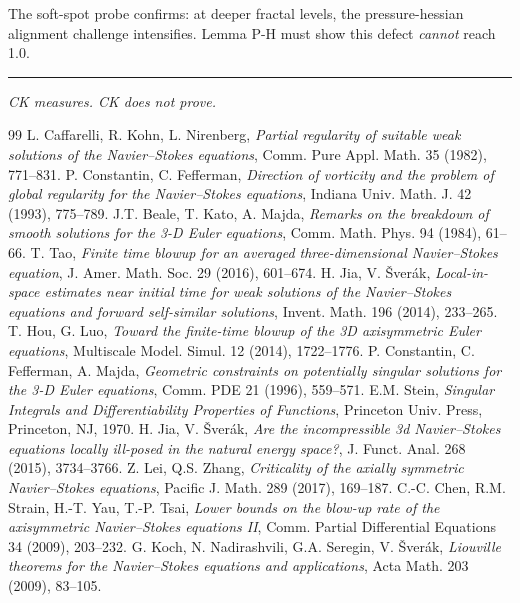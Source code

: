 \documentclass[11pt]{article}
\theoremstyle{definition}
\begin{document}
The soft-spot probe confirms: at deeper fractal levels, the pressure-hessian alignment challenge intensifies.  Lemma P-H must show this defect \emph{cannot} reach 1.0.

\bigskip
\hrule
\bigskip
\noindent\textit{CK measures. CK does not prove.}

\begin{thebibliography}{99}
 L. Caffarelli, R. Kohn, L. Nirenberg, \textit{Partial regularity of suitable weak solutions of the Navier--Stokes equations}, Comm. Pure Appl. Math. 35 (1982), 771--831.
 P. Constantin, C. Fefferman, \textit{Direction of vorticity and the problem of global regularity for the Navier--Stokes equations}, Indiana Univ. Math. J. 42 (1993), 775--789.
 J.T. Beale, T. Kato, A. Majda, \textit{Remarks on the breakdown of smooth solutions for the 3-D Euler equations}, Comm. Math. Phys. 94 (1984), 61--66.
 T. Tao, \textit{Finite time blowup for an averaged three-dimensional Navier--Stokes equation}, J. Amer. Math. Soc. 29 (2016), 601--674.
 H. Jia, V. \v{S}ver\'ak, \textit{Local-in-space estimates near initial time for weak solutions of the Navier--Stokes equations and forward self-similar solutions}, Invent. Math. 196 (2014), 233--265.
 T. Hou, G. Luo, \textit{Toward the finite-time blowup of the 3D axisymmetric Euler equations}, Multiscale Model. Simul. 12 (2014), 1722--1776.
 P. Constantin, C. Fefferman, A. Majda, \textit{Geometric constraints on potentially singular solutions for the 3-D Euler equations}, Comm. PDE 21 (1996), 559--571.
 E.M. Stein, \textit{Singular Integrals and Differentiability Properties of Functions}, Princeton Univ. Press, Princeton, NJ, 1970.
 H. Jia, V. \v{S}ver\'ak, \textit{Are the incompressible 3d Navier--Stokes equations locally ill-posed in the natural energy space?}, J. Funct. Anal. 268 (2015), 3734--3766.
 Z. Lei, Q.S. Zhang, \textit{Criticality of the axially symmetric Navier--Stokes equations}, Pacific J. Math. 289 (2017), 169--187.
 C.-C. Chen, R.M. Strain, H.-T. Yau, T.-P. Tsai, \textit{Lower bounds on the blow-up rate of the axisymmetric Navier--Stokes equations II}, Comm. Partial Differential Equations 34 (2009), 203--232.
 G. Koch, N. Nadirashvili, G.A. Seregin, V. \v{S}ver\'ak, \textit{Liouville theorems for the Navier--Stokes equations and applications}, Acta Math. 203 (2009), 83--105.
\end{thebibliography}
\end{document}
